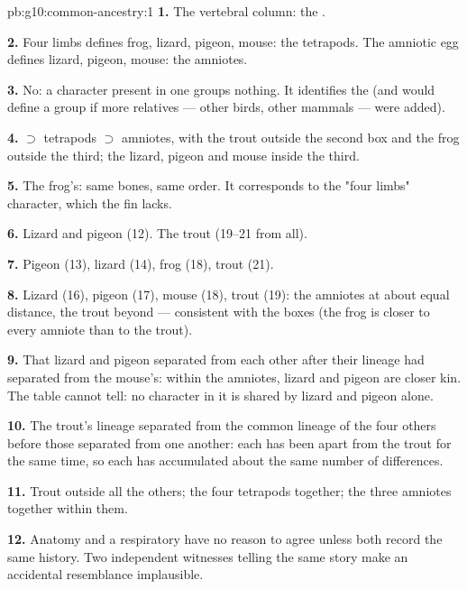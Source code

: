 \begin{solution}{pb:g10:common-ancestry:1}
\textbf{1.} The vertebral column: the .

\textbf{2.} Four limbs defines frog, lizard, pigeon, mouse: the
tetrapods. The amniotic egg defines lizard, pigeon, mouse: the
amniotes.

\textbf{3.} No: a character present in one  groups nothing. It
identifies the  (and would define a group if more relatives
--- other birds, other mammals --- were added).

\textbf{4.}  $\supset$ tetrapods $\supset$ amniotes, with the
trout outside the second box and the frog outside the third; the
lizard, pigeon and mouse inside the third.

\textbf{5.} The frog's: same bones, same order. It corresponds to the
"four limbs" character, which the fin lacks.

\textbf{6.} Lizard and pigeon (12). The trout (19--21 from all).

\textbf{7.} Pigeon (13), lizard (14), frog (18), trout (21).

\textbf{8.} Lizard (16), pigeon (17), mouse (18), trout (19): the
amniotes at about equal distance, the trout beyond --- consistent with
the boxes (the frog is closer to every amniote than to the trout).

\textbf{9.} That lizard and pigeon separated from each other after
their lineage had separated from the mouse's: within the amniotes,
lizard and pigeon are closer kin. The table cannot tell: no character
in it is shared by lizard and pigeon alone.

\textbf{10.} The trout's lineage separated from the common lineage of
the four others before those separated from one another: each has
been apart from the trout for the same time, so each has accumulated
about the same number of differences.

\textbf{11.} Trout outside all the others; the four tetrapods together;
the three amniotes together within them.

\textbf{12.} Anatomy and a respiratory  have no reason to agree
unless both record the same history. Two independent witnesses telling
the same story make an accidental resemblance implausible.


\end{solution}
